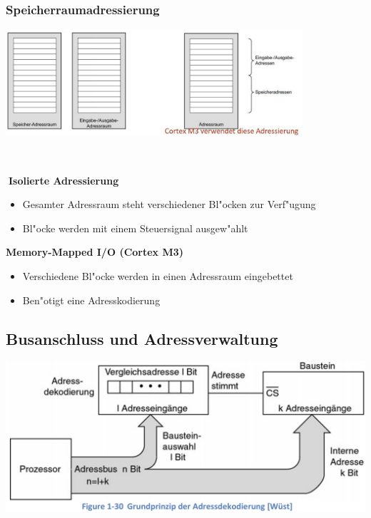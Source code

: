 \subsubsection{Speicherraumadressierung}
\begin{minipage}{11cm}
	\includegraphics[width=11cm]{images/Speicherraumadressierung}
\end{minipage}
%
\begin{minipage}{0.5cm}
	\-\
\end{minipage}
%
\begin{minipage}{7cm}
	\textbf{Isolierte Adressierung}
	\begin{itemize}
		\item Gesamter Adressraum steht verschiedener Bl"ocken zur Verf"ugung
		\item Bl"ocke werden mit einem Steuersignal ausgew"ahlt
	\end{itemize}
	\textbf{Memory-Mapped I/O (Cortex M3)}
	\begin{itemize}
		\item Verschiedene Bl"ocke werden in einen Adressraum eingebettet
		\item Ben"otigt eine Adresskodierung
	\end{itemize}
\end{minipage}

\newpage
\subsection{Busanschluss und Adressverwaltung}

\includegraphics[width=14cm]{images/Adressverwaltung}

\clearpage























